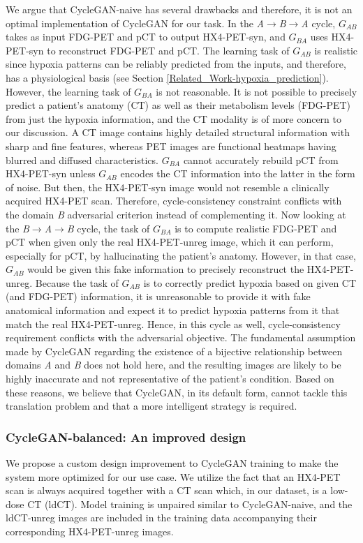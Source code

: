 We argue that CycleGAN-naive has several drawbacks and therefore, it is not an optimal implementation of CycleGAN for our task. In the \textit{A}$\rightarrow$\textit{B}$\rightarrow$\textit{A} cycle, $G_{AB}$ takes as input FDG-PET and pCT to output HX4-PET-syn, and $G_{BA}$ uses HX4-PET-syn to reconstruct FDG-PET and pCT. The learning task of $G_{AB}$ is realistic since hypoxia patterns can be reliably predicted from the inputs, and therefore, has a physiological basis (see Section \ref{Related_Work-hypoxia_prediction}). However, the learning task of $G_{BA}$ is not reasonable. It is not possible to precisely predict a patient's anatomy (CT) as well as their metabolism levels (FDG-PET) from just the hypoxia information, and the CT modality is of more concern to our discussion. A CT image contains highly detailed structural information with sharp and fine features, whereas PET images are functional heatmaps having blurred and diffused characteristics. $G_{BA}$ cannot accurately rebuild pCT from HX4-PET-syn unless $G_{AB}$ encodes the CT information into the latter in the form of noise. But then, the HX4-PET-syn image would not resemble a clinically acquired HX4-PET scan. Therefore, cycle-consistency constraint conflicts with the domain \textit{B} adversarial criterion instead of complementing it. Now looking at the \textit{B}$\rightarrow$\textit{A}$\rightarrow$\textit{B} cycle, the task of $G_{BA}$ is to compute realistic FDG-PET and pCT when given only the real HX4-PET-unreg image, which it can perform, especially for pCT, by hallucinating the patient's anatomy. However, in that case, $G_{AB}$ would be given this fake information to precisely reconstruct the HX4-PET-unreg. Because the task of $G_{AB}$ is to correctly predict hypoxia based on given CT (and FDG-PET) information, it is unreasonable to provide it with fake anatomical information and expect it to predict hypoxia patterns from it that match the real HX4-PET-unreg. Hence, in this cycle as well, cycle-consistency requirement conflicts with the adversarial objective. The fundamental assumption made by CycleGAN regarding the existence of a bijective relationship between domains \textit{A} and \textit{B}  does not hold here, and the resulting images are likely to be highly inaccurate and not representative of the patient's condition. Based on these reasons, we believe that CycleGAN, in its default form, cannot tackle this translation problem and that a more intelligent strategy is required.


\subsubsection{CycleGAN-balanced: An improved design}
We propose a custom design improvement to CycleGAN training to make the system more optimized for our use case. We utilize the fact that an HX4-PET scan is always acquired together with a CT scan which, in our dataset, is a low-dose CT (ldCT). Model training is unpaired similar to CycleGAN-naive, and the ldCT-unreg images are included in the training data accompanying their corresponding HX4-PET-unreg images. 

